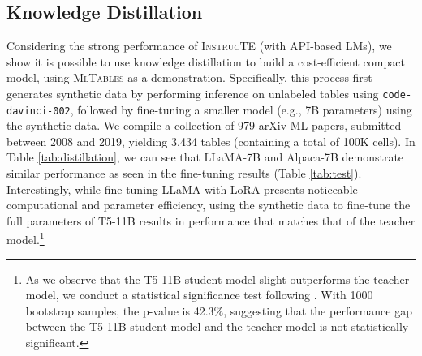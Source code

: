 \documentclass[11pt]{article}
\newcommand\data{\textsc{MlTables}}
\begin{document}
\subsection{Knowledge Distillation}
\label{sec:distill}
Considering the strong performance of \textsc{InstrucTE} (with API-based LMs), we show it is possible to use knowledge distillation \citep{le-etal-2022-shot, Kang2023DistillOA} to build a cost-efficient compact model, using \data{} as a demonstration.
Specifically, this process first generates synthetic data by performing inference on unlabeled tables using \texttt{code-davinci-002}, followed by fine-tuning a smaller model (e.g., 7B parameters) using the synthetic data.  We compile a collection of 979 arXiv ML papers, submitted between 2008 and 2019, yielding 3,434 tables (containing a total of 100K cells).
In Table \ref{tab:distillation}, we can see that LLaMA-7B and Alpaca-7B demonstrate similar performance as seen in the fine-tuning results (Table \ref{tab:test}). Interestingly, while fine-tuning LLaMA with LoRA presents noticeable computational and parameter efficiency, using the synthetic data to fine-tune the full parameters of T5-11B results in performance that matches that of the teacher model.\footnote{As we observe that the T5-11B student model slight outperforms the teacher model,  we conduct a statistical significance test following \citet{berg-kirkpatrick-etal-2012-empirical}. With 1000 bootstrap samples, the p-value is 42.3\%, suggesting that the performance gap between the T5-11B student model and the teacher model is not statistically significant.}
\end{document}

